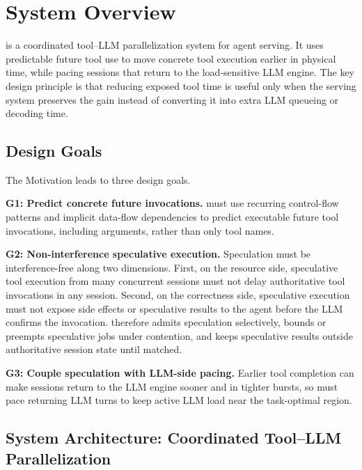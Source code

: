 \section{System Overview}
\label{sec:overview}

\sys is a coordinated tool--LLM parallelization system for agent serving.
It uses predictable future tool use to move concrete tool execution earlier in physical time, while pacing sessions that return to the load-sensitive LLM engine.
The key design principle is that reducing exposed tool time is useful only when the serving system preserves the gain instead of converting it into extra LLM queueing or decoding time.

\subsection{Design Goals}
\label{sec:overview-goals}

The Motivation leads to three design goals.

\vspace{0.35\baselineskip}
\noindent\textbf{G1: Predict concrete future invocations.}
\sys must use recurring control-flow patterns and implicit data-flow dependencies to predict executable future tool invocations, including arguments, rather than only tool names.


\vspace{0.35\baselineskip}
\noindent\textbf{G2: Non-interference speculative execution.}
Speculation must be interference-free along two dimensions.
First, on the resource side, speculative tool execution from many concurrent sessions must not delay authoritative tool invocations in any session.
Second, on the correctness side, speculative execution must not expose side effects or speculative results to the agent before the LLM confirms the invocation.
\sys therefore admits speculation selectively, bounds or preempts speculative jobs under contention, and keeps speculative results outside authoritative session state until matched.


\vspace{0.35\baselineskip}
\noindent\textbf{G3: Couple speculation with LLM-side pacing.}
Earlier tool completion can make sessions return to the LLM engine sooner and in tighter bursts, so \sys must pace returning LLM turns to keep active LLM load near the task-optimal region.

\subsection{System Architecture: Coordinated Tool--LLM Parallelization}
\label{sec:overview-architecture}

